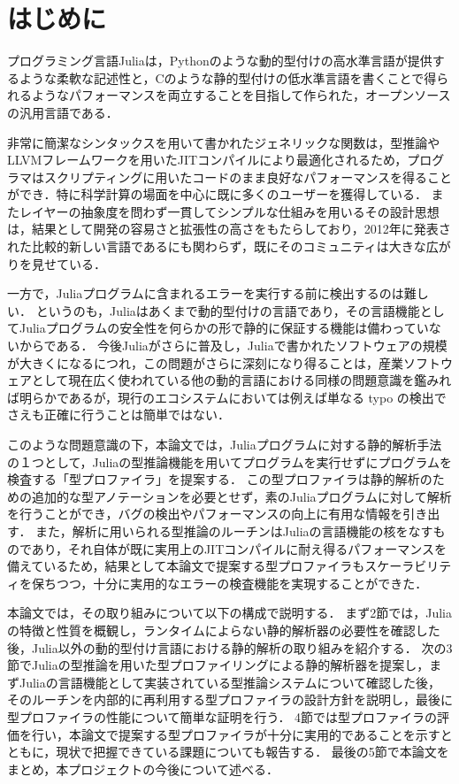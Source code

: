 
\section{はじめに}

プログラミング言語Juliaは，Pythonのような動的型付けの高水準言語が提供するような柔軟な記述性と，Cのような静的型付けの低水準言語を書くことで得られるようなパフォーマンスを両立することを目指して作られた，オープンソースの汎用言語である．

非常に簡潔なシンタックスを用いて書かれたジェネリックな関数は，型推論やLLVMフレームワークを用いたJITコンパイルにより最適化されるため，プログラマはスクリプティングに用いたコードのまま良好なパフォーマンスを得ることができ．特に科学計算の場面を中心に既に多くのユーザーを獲得している．
またレイヤーの抽象度を問わず一貫してシンプルな仕組みを用いるその設計思想は，結果として開発の容易さと拡張性の高さをもたらしており，2012年に発表された比較的新しい言語であるにも関わらず，既にそのコミュニティは大きな広がりを見せている．

一方で，Juliaプログラムに含まれるエラーを実行する前に検出するのは難しい．
というのも，Juliaはあくまで動的型付けの言語であり，その言語機能としてJuliaプログラムの安全性を何らかの形で静的に保証する機能は備わっていないからである．
今後Juliaがさらに普及し，Juliaで書かれたソフトウェアの規模が大きくになるにつれ，この問題がさらに深刻になり得ることは，産業ソフトウェアとして現在広く使われている他の動的言語における同様の問題意識を鑑みれば明らかであるが，現行のエコシステムにおいては例えば単なる typo の検出でさえも正確に行うことは簡単ではない．

このような問題意識の下，本論文では，Juliaプログラムに対する静的解析手法の１つとして，Juliaの型推論機能を用いてプログラムを実行せずにプログラムを検査する「型プロファイラ」を提案する．
この型プロファイラは静的解析のための追加的な型アノテーションを必要とせず，素のJuliaプログラムに対して解析を行うことができ，バグの検出やパフォーマンスの向上に有用な情報を引き出す．
また，解析に用いられる型推論のルーチンはJuliaの言語機能の核をなすものであり，それ自体が既に実用上のJITコンパイルに耐え得るパフォーマンスを備えているため，結果として本論文で提案する型プロファイラもスケーラビリティを保ちつつ，十分に実用的なエラーの検査機能を実現することができた．

本論文では，その取り組みについて以下の構成で説明する．
まず2節では，Juliaの特徴と性質を概観し，ランタイムによらない静的解析器の必要性を確認した後，Julia以外の動的型付け言語における静的解析の取り組みを紹介する．
次の3節でJuliaの型推論を用いた型プロファイリングによる静的解析器を提案し，まずJuliaの言語機能として実装されている型推論システムについて確認した後，そのルーチンを内部的に再利用する型プロファイラの設計方針を説明し，最後に型プロファイラの性能について簡単な証明を行う． %
4節では型プロファイラの評価を行い，本論文で提案する型プロファイラが十分に実用的であることを示すとともに，現状で把握できている課題についても報告する．
最後の5節で本論文をまとめ，本プロジェクトの今後について述べる．
